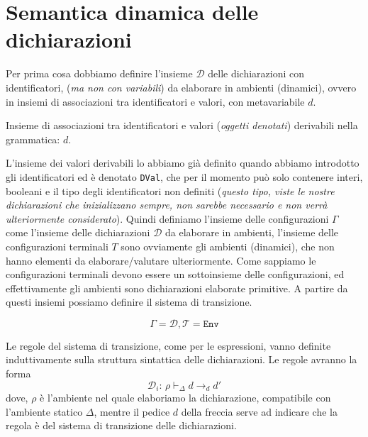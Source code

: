 \documentclass[oneside,a4paper,11pt]{book}
\theoremstyle{italicstyle}
\theoremstyle{normStyle}
\begin{document}
\section{Semantica dinamica delle dichiarazioni}
Per prima cosa dobbiamo definire l’insieme $\mathcal{D}$ delle
dichiarazioni con identificatori, (\textit{ma non con variabili}) da
elaborare in ambienti (dinamici), ovvero in insiemi di associazioni
tra identificatori e valori, con metavariabile $d$.
\begin{tcolorbox}[title={Dichiarazioni $\mathcal{D}$}]
  Insieme di associazioni tra identificatori e valori (\textit{oggetti 
  denotati}) derivabili nella grammatica: $d$.
\end{tcolorbox}
L’insieme dei valori derivabili lo abbiamo già definito quando abbiamo introdotto gli
identificatori ed è denotato \verb|DVal|, che per il momento può solo
contenere interi, booleani e il tipo degli identificatori non definiti
(\textit{questo tipo, viste le nostre dichiarazioni che inizializzano sempre,
non sarebbe necessario e non verrà ulteriormente considerato}).
Quindi definiamo l’insieme delle configurazioni $\Gamma$ come l’insieme
delle dichiarazioni $\mathcal{D}$ da elaborare in ambienti,
l’insieme delle configurazioni terminali $T$ sono ovviamente gli
ambienti (dinamici), che non hanno elementi da elaborare/valutare
ulteriormente. Come sappiamo le configurazioni terminali devono
essere un sottoinsieme delle configurazioni, ed effettivamente gli
ambienti sono dichiarazioni elaborate primitive. A partire da questi
insiemi possiamo definire il sistema di transizione.
\begin{tcolorbox}[title = {Sistema di transazione}]
  \[\Gamma = \mathcal{D}, \mathcal{T}= \texttt{Env}\]
\end{tcolorbox}
Le regole del sistema di transizione, come per le espressioni,
vanno definite induttivamente sulla struttura sintattica delle
dichiarazioni. Le regole avranno la forma
\[
  \mathcal{D}_i:\,\rho \vdash_\Delta d \rightarrow_d d'
\]
dove, $\rho$ è l’ambiente nel quale elaboriamo la dichiarazione,
compatibile con l’ambiente statico $\Delta$, mentre il pedice $d$
della freccia serve ad indicare che la regola è del sistema di
transizione delle dichiarazioni.
\end{document}
